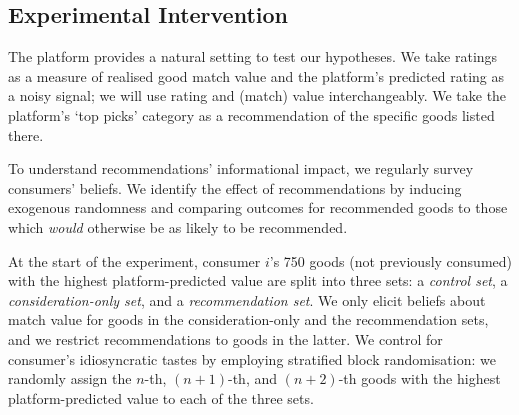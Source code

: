 \documentclass[12pt]{article}
\theoremstyle{newtheorem}
\begin{document}
\subsection{Experimental Intervention}
\label{section:design:experimental-intervention}
The platform provides a natural setting to test our hypotheses.
We take ratings as a measure of realised good match value and the platform's predicted rating as a noisy signal; we will use rating and (match) value interchangeably.
We take the platform's `top picks' category as a recommendation of the specific goods listed there.


To understand recommendations' informational impact, we regularly survey consumers' beliefs. 
We identify the effect of recommendations by inducing exogenous randomness and comparing outcomes for recommended goods to those which \emph{would} otherwise be as likely to be recommended.


At the start of the experiment, consumer $i$'s 750 goods (not previously consumed) with the highest platform-predicted value are split into three sets: a \emph{control set}, a \emph{consideration-only set}, and a \emph{recommendation set}. 
We only elicit beliefs about match value for goods in the consideration-only and the recommendation sets, and we restrict recommendations to goods in the latter. 
We control for consumer's idiosyncratic tastes by employing stratified block randomisation: we randomly assign the $n$-th, $(n+1)$-th, and $(n+2)$-th goods with the highest platform-predicted value to each of the three sets.
\end{document}
